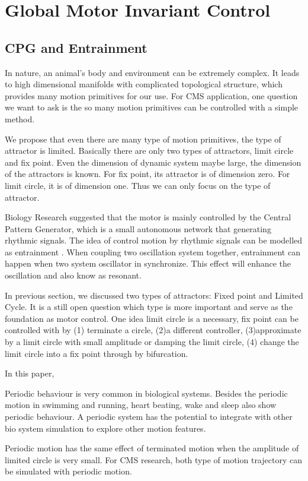 \section{Global Motor Invariant Control}
\subsection{CPG and Entrainment}
In nature, an animal's body and environment can be extremely complex. 
It leads to high dimensional manifolds with complicated topological structure, which provides many motion primitives for our use.
For CMS application, one question we want to ask is the so many motion primitives can be controlled with a simple method.

We propose that even there are many type of motion primitives, the type of attractor is limited. Basically there are only two types of attractors, limit circle and fix point.
Even the dimension of dynamic system maybe large, the dimension of the attractors is known. 
For fix point, its attractor is of dimension zero.
For limit circle, it is of dimension one.
Thus we can only focus on the type of attractor.



Biology Research suggested that the motor is mainly controlled by the Central Pattern Generator, which is a small autonomous network that generating rhythmic signals.
The idea of control motion by rhythmic signals can be modelled as entrainment \citep{Gonz'alez-Miranda2004}.
When coupling two oscillation system together, entrainment can happen when two system oscillator in synchronize. 
This effect will enhance the oscillation and also know as resonant. 




In previous section, we discussed two types of attractors: Fixed point and Limited Cycle. 
It is a still open question which type is more important and serve as the foundation as motor control\citep{Degallier2010}.
One idea limit circle is a necessary, fix point can be controlled with by 
(1) terminate a circle, 
(2)a different controller, 
(3)approximate by a limit circle with small amplitude or damping the limit circle, 
(4) change the limit circle into a fix point through by bifurcation. 



In this paper, 
\begin{itemize}
\HiItem Periodic behaviour is very common in biological systems. 
Besides the periodic motion in swimming and running, heart beating, wake and sleep also show periodic behaviour.
A periodic system has the potential to integrate with other bio system simulation to explore other motion features.

\HiItem Periodic motion has the same effect of terminated motion when the amplitude of limited circle is very small. 
For CMS research, both type of motion trajectory can be simulated with periodic motion.

\end{itemize}

